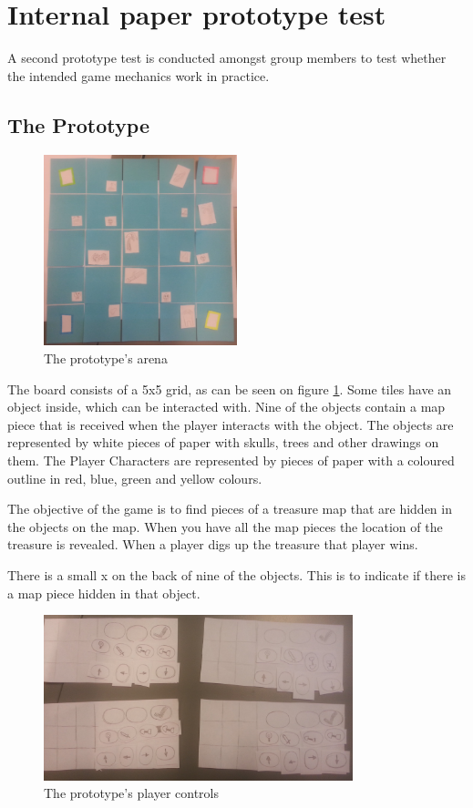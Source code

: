 \section{Internal paper prototype test}
A second prototype test is conducted amongst group members to test whether the intended game mechanics work in practice.

\subsection{The Prototype}
\begin{figure}[h] 
\centering 
\includegraphics[width=0.5\textwidth]{figures/PPtestArena}
\caption{The prototype's arena} \label{fig:PPtest1}
\end{figure}
The board consists of a 5x5 grid, as can be seen on figure \ref{fig:PPtest1}. Some tiles have an object inside, which can be interacted with. Nine of the objects contain a map piece that is received when the player interacts with the object. The objects are represented by white pieces of paper with skulls, trees and other drawings on them. The Player Characters are represented by pieces of paper with a coloured outline in red, blue, green and yellow colours.

The objective of the game is to find pieces of a treasure map that are hidden in the objects on the map. When you have all the map pieces the location of the treasure is revealed. When a player digs up the treasure that player wins.


There is a small x on the back of nine of the objects. This is to indicate if there is a map piece hidden in that object.

\begin{figure}[h]
\centering
\includegraphics[width=0.8\textwidth]{figures/PPtestControls}  
\caption{The prototype's player controls}\label{fig:PPtest2}
\end{figure}

